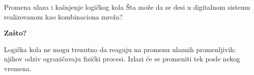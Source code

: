 \begin{frame}[label=02-s002b]{Promena ulaza i kašnjenje logičkog kola}
Šta može da se desi u digitalnom sistemu realizovanom kao kombinaciona mreža?
\par\vspace{4mm}
\par\vspace{4mm}
\textbf{Zašto?}\par\vspace{2mm}
Logička kola ne mogu trenutno da reaguju na promenu ulaznih promenljivih: njihov odziv ograničavaju fizički procesi. Izlazi će se promeniti tek posle nekog vremena.
\par\vspace{4mm}
\end{frame}

